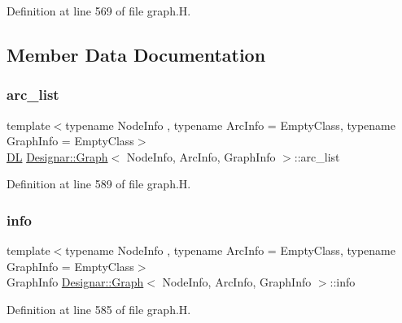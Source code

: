 Definition at line 569 of file graph.\+H.



\subsection{Member Data Documentation}
\mbox{\label{class_designar_1_1_graph_a8c809db7848c78f6718aad466ee959b2}} 
\subsubsection{\texorpdfstring{arc\+\_\+list}{arc\_list}}
{\footnotesize\ttfamily template$<$typename Node\+Info , typename Arc\+Info  = Empty\+Class, typename Graph\+Info  = Empty\+Class$>$ \\
\hyperlink{class_designar_1_1_d_l}{DL} \hyperlink{class_designar_1_1_graph}{Designar\+::\+Graph}$<$ Node\+Info, Arc\+Info, Graph\+Info $>$\+::arc\+\_\+list\hspace{0.3cm}{\ttfamily [protected]}}



Definition at line 589 of file graph.\+H.

\mbox{\label{class_designar_1_1_graph_a2a8b41ce641ad2fb1b84a4d6b024bb1a}} 
\subsubsection{\texorpdfstring{info}{info}}
{\footnotesize\ttfamily template$<$typename Node\+Info , typename Arc\+Info  = Empty\+Class, typename Graph\+Info  = Empty\+Class$>$ \\
Graph\+Info \hyperlink{class_designar_1_1_graph}{Designar\+::\+Graph}$<$ Node\+Info, Arc\+Info, Graph\+Info $>$\+::info\hspace{0.3cm}{\ttfamily [protected]}}



Definition at line 585 of file graph.\+H.

\mbox{\label{class_designar_1_1_graph_a31b0117b6d87816f703a4a5baa1fa6ce}} 
